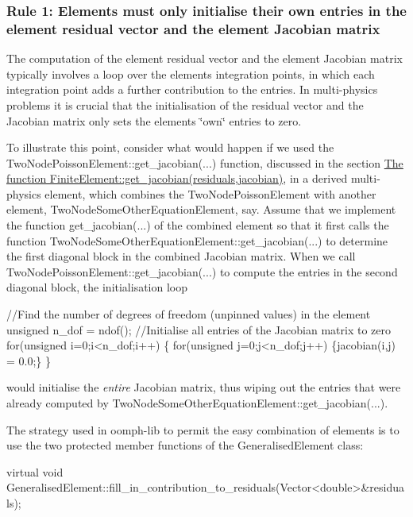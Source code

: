 \hypertarget{index_dont_wipe}{}\subsubsection{Rule 1\+: Elements must only initialise their own entries in the element residual vector and the element Jacobian matrix}\label{index_dont_wipe}
The computation of the element residual vector and the element Jacobian matrix typically involves a loop over the element\textquotesingle{}s integration points, in which each integration point adds a further contribution to the entries. In multi-\/physics problems it is crucial that the initialisation of the residual vector and the Jacobian matrix only sets the element\textquotesingle{}s \char`\"{}own\char`\"{} entries to zero.

To illustrate this point, consider what would happen if we used the {\ttfamily Two\+Node\+Poisson\+Element\+::get\+\_\+jacobian}(...) function, discussed in the section \hyperlink{index_jac}{The function Finite\+Element\+::get\+\_\+jacobian(residuals,jacobian)}, in a derived multi-\/physics element, which combines the {\ttfamily Two\+Node\+Poisson\+Element} with another element, {\ttfamily Two\+Node\+Some\+Other\+Equation\+Element}, say. Assume that we implement the function {\ttfamily get\+\_\+jacobian}(...) of the combined element so that it first calls the function {\ttfamily Two\+Node\+Some\+Other\+Equation\+Element\+::get\+\_\+jacobian}(...) to determine the first diagonal block in the combined Jacobian matrix. When we call {\ttfamily Two\+Node\+Poisson\+Element\+::get\+\_\+jacobian}(...) to compute the entries in the second diagonal block, the initialisation loop


\begin{DoxyCode}
\textcolor{comment}{//Find the number of degrees of freedom (unpinned values) in the element}
 \textcolor{keywordtype}{unsigned} n\_dof = ndof();
\textcolor{comment}{//Initialise all entries of the Jacobian matrix to zero}
\textcolor{keywordflow}{for}(\textcolor{keywordtype}{unsigned} i=0;i<n\_dof;i++) 
 \{
  \textcolor{keywordflow}{for}(\textcolor{keywordtype}{unsigned} j=0;j<n\_dof;j++) \{jacobian(i,j) = 0.0;\}
 \}
\end{DoxyCode}


would initialise the {\itshape entire} Jacobian matrix, thus wiping out the entries that were already computed by {\ttfamily Two\+Node\+Some\+Other\+Equation\+Element\+::get\+\_\+jacobian}(...).

The strategy used in {\ttfamily oomph-\/lib} to permit the easy combination of elements is to use the two protected member functions of the {\ttfamily Generalised\+Element} class\+: 
\begin{DoxyCode}
\textcolor{keyword}{virtual} \textcolor{keywordtype}{void} GeneralisedElement::fill\_in\_contribution\_to\_residuals(Vector<double>&residuals);
\end{DoxyCode}


